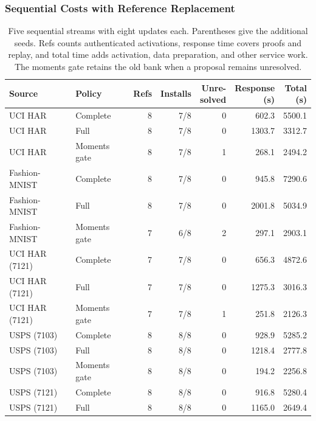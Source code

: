 \documentclass[5p,times,twocolumn]{elsarticle}
\begin{document}
\subsubsection{Sequential Costs with Reference Replacement}
\begin{table}[!t]
\centering
\begin{minipage}[t]{.49\textwidth}
\vspace{0pt}
\centering\small
\caption{Five sequential streams with eight updates each. Parentheses give the
additional seeds. Refs counts authenticated activations, response time
covers proofs and replay, and total time adds activation, data preparation,
and other service work. The moments gate retains the old bank when
a proposal remains unresolved.}
\label{tab:checked-workflows}
\setlength{\tabcolsep}{1pt}
\begin{tabular}{@{}llrrrrr@{}}\toprule
Source & Policy & Refs & Installs & \shortstack{Unre-\\solved} & \shortstack{Response\\(s)} & \shortstack{Total\\(s)}\\\midrule
UCI HAR & Complete & 8 & 7/8 & 0 & 602.3 & 5500.1\\
UCI HAR & Full & 8 & 7/8 & 0 & 1303.7 & 3312.7\\
UCI HAR & Moments gate & 8 & 7/8 & 1 & 268.1 & 2494.2\\
\addlinespace[2pt]
Fashion-MNIST & Complete & 8 & 7/8 & 0 & 945.8 & 7290.6\\
Fashion-MNIST & Full & 8 & 7/8 & 0 & 2001.8 & 5034.9\\
Fashion-MNIST & Moments gate & 7 & 6/8 & 2 & 297.1 & 2903.1\\
\addlinespace[2pt]
UCI HAR (7121) & Complete & 7 & 7/8 & 0 & 656.3 & 4872.6\\
UCI HAR (7121) & Full & 7 & 7/8 & 0 & 1275.3 & 3016.3\\
UCI HAR (7121) & Moments gate & 7 & 7/8 & 1 & 251.8 & 2126.3\\
\addlinespace[2pt]
USPS (7103) & Complete & 8 & 8/8 & 0 & 928.9 & 5285.2\\
USPS (7103) & Full & 8 & 8/8 & 0 & 1218.4 & 2777.8\\
USPS (7103) & Moments gate & 8 & 8/8 & 0 & 194.2 & 2256.8\\
\addlinespace[2pt]
USPS (7121) & Complete & 8 & 8/8 & 0 & 916.8 & 5280.4\\
USPS (7121) & Full & 8 & 8/8 & 0 & 1165.0 & 2649.4\\

\end{tabular}
\end{minipage}
\end{table}
\end{document}
